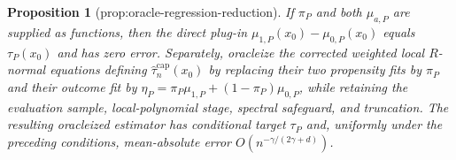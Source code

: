 \documentclass{article}
\newtheorem{proposition}{Proposition}
\begin{document}
\begin{proposition}[prop:oracle-regression-reduction]\label{prop:oracle-regression-reduction}
If \(\pi_P\) and both \(\mu_{a,P}\) are supplied as functions, then the direct plug-in \(\mu_{1,P}(x_0)-\mu_{0,P}(x_0)\) equals \(\tau_P(x_0)\) and has zero error.  Separately, oracleize the corrected weighted local \(R\)-normal equations defining \(\widehat{\tau}^{\mathrm{cap}}_n(x_0)\) by replacing their two propensity fits by \(\pi_P\) and their outcome fit by \(\eta_P=\pi_P\mu_{1,P}+(1-\pi_P)\mu_{0,P}\), while retaining the evaluation sample, local-polynomial stage, spectral safeguard, and truncation.  The resulting oracleized estimator has conditional target \(\tau_P\) and, uniformly under the preceding conditions, mean-absolute error \(O(n^{-\gamma/(2\gamma+d)})\).
\end{proposition}
\end{document}
